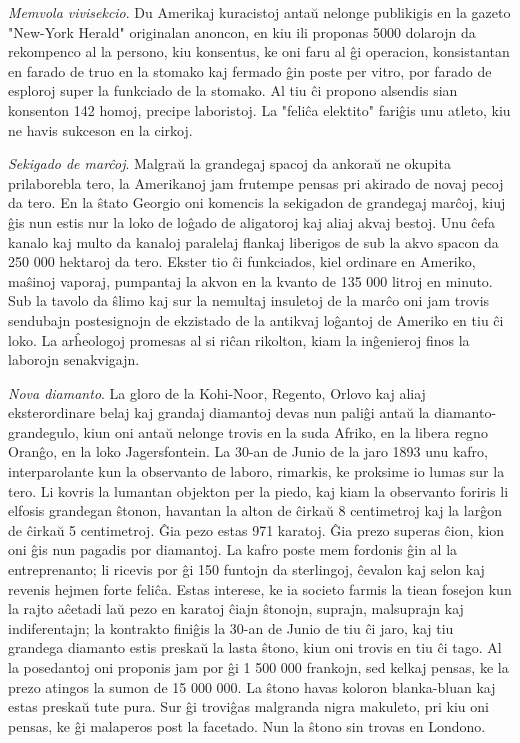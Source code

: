 \emph{Memvola vivisekcio}. Du Amerikaj kuracistoj anta\u u nelonge
publikigis en la gazeto "New-York Herald" originalan anoncon, en
kiu ili proponas 5000 dolarojn da rekompenco al la persono, kiu
konsentus, ke oni faru al \^gi operacion, konsistantan en farado de
truo en la stomako kaj fermado \^gin poste per vitro, por farado de
esploroj super la funkciado de la stomako. Al tiu \^ci propono
alsendis sian konsenton 142 homoj, precipe laboristoj. La "feli\^ca
elektito" fari\^gis unu atleto, kiu ne havis sukceson en la cirkoj.

\emph{Sekigado de mar\^coj}. Malgra\u u la grandegaj spacoj da
ankora\u u ne okupita prilaborebla tero, la Amerikanoj jam frutempe
pensas pri akirado de novaj pecoj da tero. En la \^stato Georgio oni
komencis la sekigadon de grandegaj mar\^coj, kiuj \^gis nun estis
nur la loko de lo\^gado de aligatoroj kaj aliaj akvaj bestoj. Unu
\^cefa kanalo kaj multo da kanaloj paralelaj flankaj liberigos de
sub la akvo spacon da 250 000 hektaroj da tero. Ekster tio \^ci
funkciados, kiel ordinare en Ameriko, ma\^sinoj vaporaj, pumpantaj
la akvon en la kvanto de 135 000 litroj en minuto. Sub la tavolo da
\^slimo kaj sur la nemultaj insuletoj de la mar\^co oni jam trovis
sendubajn postesignojn de ekzistado de la antikvaj lo\^gantoj de
Ameriko en tiu \^ci loko. La ar\^heologoj promesas al si ri\^can
rikolton, kiam la in\^genieroj finos la laborojn senakvigajn.

\emph{Nova diamanto}. La gloro de la Kohi-Noor, Regento, Orlovo kaj
aliaj eksterordinare belaj kaj grandaj diamantoj devas nun pali\^gi
anta\u u la diamanto-grandegulo, kiun oni anta\u u nelonge trovis en
la suda Afriko, en la libera regno Oran\^go, en la loko
Jagersfontein. La 30-an de Junio de la jaro 1893 unu kafro,
interparolante kun la observanto de laboro, rimarkis, ke proksime io
lumas sur la tero. Li kovris la lumantan objekton per la piedo, kaj
kiam la observanto foriris li elfosis grandegan \^stonon, havantan
la alton de \^cirka\u u 8 centimetroj kaj la lar\^gon de \^cirka\u u
5 centimetroj. \^Gia pezo estas 971 karatoj. \^Gia prezo superas
\^cion, kion oni \^gis nun pagadis por diamantoj. La kafro poste mem
fordonis \^gin al la entreprenanto; li ricevis por \^gi 150 funtojn
da sterlingoj, \^cevalon kaj selon kaj revenis hejmen forte
feli\^ca. Estas interese, ke ia societo farmis la tiean fosejon kun
la rajto a\^cetadi la\u u pezo en karatoj \^ciajn \^stonojn,
suprajn, malsuprajn kaj indiferentajn; la kontrakto fini\^gis la
30-an de Junio de tiu \^ci jaro, kaj tiu grandega diamanto estis
preska\u u la lasta \^stono, kiun oni trovis en tiu \^ci tago. Al la
posedantoj oni proponis jam por \^gi 1 500 000 frankojn, sed kelkaj
pensas, ke la prezo atingos la sumon de 15 000 000. La \^stono havas
koloron blanka-bluan kaj estas preska\u u tute pura. Sur \^gi
trovi\^gas malgranda nigra makuleto, pri kiu oni pensas, ke \^gi
malaperos post la facetado. Nun la \^stono sin trovas en Londono.

